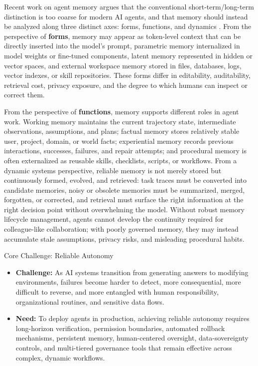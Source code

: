 Recent work on agent memory argues that the conventional short-term/long-term distinction is too coarse for modern AI agents, and that memory should instead be analyzed along three distinct axes: forms, functions, and dynamics \citep{Hu2025MemoryIT}. From the perspective of \textbf{forms}, memory may appear as token-level context that can be directly inserted into the model's prompt, parametric memory internalized in model weights or fine-tuned components, latent memory represented in hidden or vector spaces, and external workspace memory stored in files, databases, logs, vector indexes, or skill repositories. These forms differ in editability, auditability, retrieval cost, privacy exposure, and the degree to which humans can inspect or correct them.

From the perspective of \textbf{functions}, memory supports different roles in agent work. Working memory maintains the current trajectory state, intermediate observations, assumptions, and plans; factual memory stores relatively stable user, project, domain, or world facts; experiential memory records previous interactions, successes, failures, and repair attempts; and procedural memory is often externalized as reusable skills, checklists, scripts, or workflows. From a dynamic systems perspective, reliable memory is not merely stored but continuously formed, evolved, and retrieved: task traces must be converted into candidate memories, noisy or obsolete memories must be summarized, merged, forgotten, or corrected, and retrieval must surface the right information at the right decision point without overwhelming the model. Without robust memory lifecycle management, agents cannot develop the continuity required for colleague-like collaboration; with poorly governed memory, they may instead accumulate stale assumptions, privacy risks, and misleading procedural habits.

\begin{AIbox}{Core Challenge: Reliable Autonomy}
    \begin{itemize}[left=2pt,topsep=1pt,itemsep=2pt, parsep=1pt]
        \item \textbf{Challenge:} As AI systems transition from generating answers to modifying environments, failures become harder to detect, more consequential, more difficult to reverse, and more entangled with human responsibility, organizational routines, and sensitive data flows.

        \item \textbf{Need:} To deploy agents in production, achieving reliable autonomy requires long-horizon verification, permission boundaries, automated rollback mechanisms, persistent memory, human-centered oversight, data-sovereignty controls, and multi-tiered governance tools that remain effective across complex, dynamic workflows.
    \end{itemize}
\end{AIbox}




